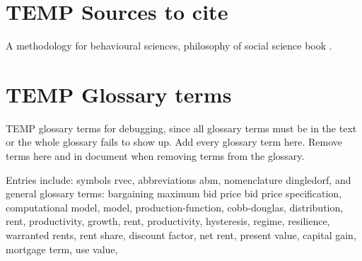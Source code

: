 \section{TEMP Sources to cite}
A methodology for behavioural sciences, philosophy of social science book \cite {kaplanConductInquiryMethodology2017}.


\section{TEMP Glossary terms}

TEMP glossary terms for debugging, since all glossary terms must be in the text or the whole glossary fails to show up. Add every glossary term here. Remove terms here and in document when removing terms from the glossary. %

Entries include:  
symbols \gls{rvec}, 
abbreviations \gls{abm}, 
nomenclature \gls{dingledorf}, and general glossary terms: 
\gls{bargaining}
\gls{maximum bid price}
\gls{bid price}
\gls{specification}, 
\gls{computational model}, 
\gls{model},  
\gls{production-function}, 
\gls{cobb-douglas}, 
\gls{distribution},
\gls{rent}, 
\gls{productivity}, 
\gls{growth}, 
\gls{rent}, 
\gls{productivity}, 
\gls{hysteresis}, 
\gls{regime}, 
\gls{resilience}, 
\gls{warranted rents}, 
\gls{rent share},
\gls{discount factor},
\gls{net rent}, 
\gls{present value}, 
\gls{capital gain},
\gls{mortgage term},
\gls{use value},
